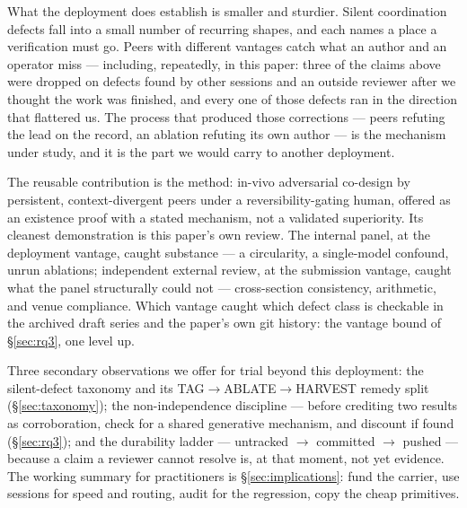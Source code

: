 \documentclass[10pt,conference]{IEEEtran}   %
\begin{document}
What the deployment does establish is smaller and sturdier. Silent coordination defects fall into a
small number of recurring shapes, and each names a place a verification must go. Peers with different vantages catch
what an author and an operator miss --- including, repeatedly, in this paper: three of the claims
above were dropped on defects found by other sessions and an outside reviewer after we thought the
work was finished, and every one of those defects ran in the direction that flattered us. The process
that produced those corrections --- peers refuting the lead on the record, an ablation refuting its
own author --- is the mechanism under study, and it is the part we would carry to another
deployment.

The reusable contribution is the method: in-vivo adversarial co-design by persistent,
context-divergent peers under a reversibility-gating human, offered as an existence proof with
a stated mechanism, not a validated superiority. Its cleanest demonstration is this paper's own
review. The internal panel, at the deployment vantage, caught substance --- a circularity, a
single-model confound, unrun ablations; independent external review, at the submission vantage,
caught what the panel structurally could not --- cross-section consistency, arithmetic, and
venue compliance. Which vantage caught which defect class is checkable in the archived draft
series and the paper's own git history: the vantage bound of \S\ref{sec:rq3}, one level up.

Three secondary observations we offer for trial beyond this deployment: the silent-defect taxonomy and its
TAG$\rightarrow$ABLATE$\rightarrow$HARVEST remedy split (\S\ref{sec:taxonomy}); the non-independence
discipline --- before crediting two results as corroboration, check for a shared generative
mechanism, and discount if found (\S\ref{sec:rq3}); and the durability ladder --- untracked
$\rightarrow$ committed $\rightarrow$ pushed --- because a claim a reviewer cannot resolve is,
at that moment, not yet evidence. The working summary for practitioners is \S\ref{sec:implications}: fund the
carrier, use sessions for speed and routing, audit for the regression, copy the cheap
primitives.
\end{document}
